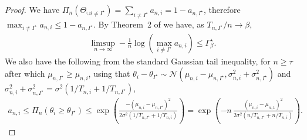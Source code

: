 \begin{proof}
	We have $\Pi_{n}(\Theta_{\cup i \neq I^\star}) = \sum_{i \neq I^\star} a_{n,i} = 1 - a_{n,I^\star}$, therefore $ \max_{i \neq I^\star} a_{n,i} \leq 1 - a_{n,I^\star}$. By Theorem~2 of \cite{qin2017ttei} we have, as $T_{n,I^\star}/n \rightarrow \beta$, 
	\begin{align*}
	\limsup_{n \rightarrow \infty} - \frac{1}{n} \log\left(\max_{i \neq I^\star} a_{n,i}\right) \leq \Gamma_{\beta}^\star.
	\end{align*}
	We also have the following from the standard Gaussian tail inequality, for $n \geq \tau$ after which $\mu_{n, I^\star} \geq \mu_{n, i}$, using that $\theta_i - \theta_{I^\star} \sim \mathcal{N}(\mu_{n,i} - \mu_{n, I^\star} , \sigma^2_{n,i} + \sigma^2_{n, I^\star} )$ and $\sigma^2_{n,i} + \sigma^2_{n, I^\star} = \sigma^2 (1/ T_{n,i} + 1/T_{n,I^\star})$,
	\begin{align*}
	a_{n,i} \leq \Pi_{n}(\theta_i \geq \theta_{I^\star})  \leq \exp \left( \frac{- (\mu_{n,i} - \mu_{n,I^\star})^2}{2\sigma^2 (1/T_{n,I^\star} +1/T_{n,i})} \right)
	= \exp \left(-n \, \frac{(\mu_{n,i} - \mu_{n,1})^2}{2\sigma^2 (n/T_{n,I^\star} +n/T_{n,i})} \right).
	\end{align*}
	

\end{proof}
